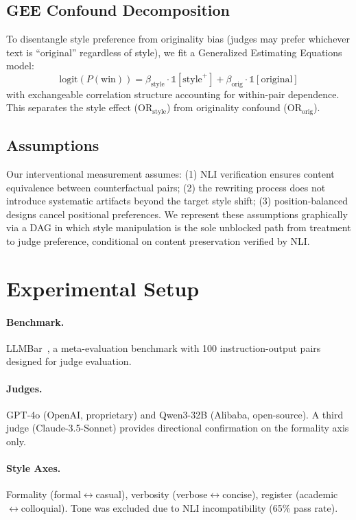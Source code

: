\documentclass[11pt,a4paper]{article}
\begin{document}
\subsection{GEE Confound Decomposition}

To disentangle style preference from originality bias (judges may prefer whichever text is ``original'' regardless of style), we fit a Generalized Estimating Equations model:
\begin{equation}
\text{logit}(P(\text{win})) = \beta_{\text{style}} \cdot \mathbb{1}[\text{style}^+] + \beta_{\text{orig}} \cdot \mathbb{1}[\text{original}]
\end{equation}
with exchangeable correlation structure accounting for within-pair dependence. This separates the style effect (OR$_{\text{style}}$) from originality confound (OR$_{\text{orig}}$).

\subsection{Assumptions}

Our interventional measurement assumes: (1) NLI verification ensures content equivalence between counterfactual pairs; (2) the rewriting process does not introduce systematic artifacts beyond the target style shift; (3) position-balanced designs cancel positional preferences. We represent these assumptions graphically via a DAG in which style manipulation is the sole unblocked path from treatment to judge preference, conditional on content preservation verified by NLI.

\section{Experimental Setup}

\paragraph{Benchmark.} LLMBar~\cite{zeng2024llmbar}, a meta-evaluation benchmark with 100 instruction-output pairs designed for judge evaluation.

\paragraph{Judges.} GPT-4o (OpenAI, proprietary) and Qwen3-32B (Alibaba, open-source). A third judge (Claude-3.5-Sonnet) provides directional confirmation on the formality axis only.

\paragraph{Style Axes.} Formality (formal$\leftrightarrow$casual), verbosity (verbose$\leftrightarrow$concise), register (academic$\leftrightarrow$colloquial). Tone was excluded due to NLI incompatibility (65\% pass rate).
\end{document}
